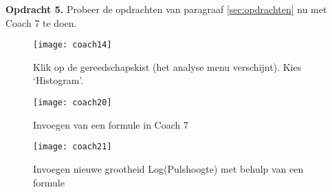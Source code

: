 \textbf{Opdracht 5.}
Probeer de opdrachten van paragraaf \ref{sec:opdrachten} nu met Coach 7 te doen.

\begin{figure}
    \centering
    \texttt{[image: coach14]}
    \caption{Klik op de gereedschapskist (het analyse menu verschijnt). Kies `Histogram'.}
    \label{fig:coach14}
\end{figure}

\begin{figure}
    \centering
    \texttt{[image: coach20]}
    \caption{Invoegen van een formule in Coach 7}
    \label{fig:coach20}
\end{figure}

\begin{figure}
    \centering
    \texttt{[image: coach21]}
    \caption{Invoegen nieuwe grootheid Log(Pulshoogte) met behulp van een
    formule}
    \label{fig:coach21}
\end{figure}

